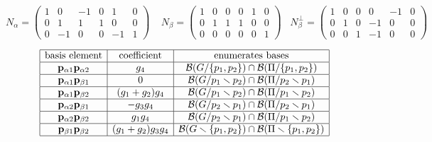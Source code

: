 \[
N_\alpha=
\left(\begin{array}
{cc|cccc}
1 & 0 & -1 & 0 & 1 & 0 \\
0 & 1 & 1 & 1 & 0 & 0 \\
0 & -1 & 0 & 0 & -1 & 1
\end{array}\right)
\;\;\;\;
N_\beta=
\left(\begin{array}
{cc|cccc}
1 & 0 & 0 & 0 & 1 & 0 \\
0 & 1 & 1 & 1 & 0 & 0 \\
0 & 0 & 0 & 0 & 0 & 1
\end{array}\right)
\;\;\;
N_\beta^\perp =
\left(\begin{array}{cc|cccc}
1 & 0 & 0 & 0 & -1 & 0 \\
0 & 1 & 0 & -1 & 0 & 0 \\
0 & 0 & 1 & -1 & 0 & 0
\end{array}\right)
\]


\begin{equation}\label{K4Dirtable}
\begin{array}{|c|c|c|} \hline
\text{basis element} & \text{coefficient} & \text{enumerates bases}\\
  \hline

\mathbf{p}_{\alpha 1}\mathbf{p}_{\alpha 2} &
 g_{4} & \mathcal{B}(G/\{p_1, p_2\}) \cap  \mathcal{B}(\Pi/\{p_1, p_2\})

\\ \hline

\mathbf{p}_{\alpha 1}\mathbf{p}_{\beta 1} &
0 &  \mathcal{B}(G/p_1\smallsetminus p_2)\cap\mathcal{B}(\Pi/p_2\smallsetminus p_1)

\\ \hline

\mathbf{p}_{\alpha 1}\mathbf{p}_{\beta 2} &
 (g_{1} +  g_{2}) g_{4} & \mathcal{B}(G/p_1\smallsetminus p_2)  \cap \mathcal{B}(\Pi/p_1\smallsetminus p_2)
\\ \hline 

\mathbf{p}_{\alpha 2}\mathbf{p}_{\beta 1} &
- g_{3} g_{4} & \mathcal{B}(G/p_2\smallsetminus p_1) \cap \mathcal{B}(\Pi/p_2\smallsetminus p_1)
\\ \hline
 
\mathbf{p}_{\alpha 2}\mathbf{p}_{\beta 2} &
 g_{1} g_{4} & \mathcal{B}(G/p_2\smallsetminus p_1)\cap\mathcal{B}(\Pi/p_1\smallsetminus p_2)
\\ \hline
 
\mathbf{p}_{\beta 1}\mathbf{p}_{\beta 2} &
 (g_{1} +g_{2}) g_{3} g_{4} & \mathcal{B}(G\smallsetminus \{p_1, p_2\})  \cap \mathcal{B}(\Pi\smallsetminus \{p_1, p_2\})
\\ \hline

\end{array}
\end{equation}



